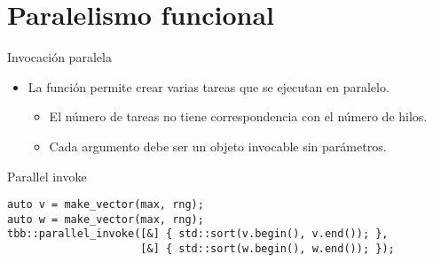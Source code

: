 \section{Paralelismo funcional}

\begin{frame}[t,fragile]{Invocación paralela}
\begin{itemize}
  \item La función  permite
        crear varias tareas que se ejecutan en paralelo.
    \begin{itemize}
      \item El número de tareas no tiene correspondencia con el número de hilos.
      \item Cada argumento debe ser un objeto invocable sin parámetros.
    \end{itemize}
\end{itemize}

\begin{block}{Parallel invoke}
\begin{lstlisting}
auto v = make_vector(max, rng);
auto w = make_vector(max, rng);
tbb::parallel_invoke([&] { std::sort(v.begin(), v.end()); },
                     [&] { std::sort(w.begin(), w.end()); });
\end{lstlisting}
\end{block}
\end{frame}
